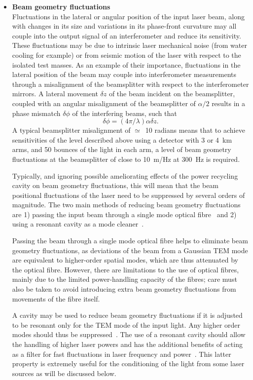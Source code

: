\documentclass{article}
\newcommand{\Hz}{Hz\super{-1/2}\xspace}
\begin{document}
\begin{itemize}
\item \textbf{Beam geometry fluctuations} \\
Fluctuations in the lateral or angular position of the input laser beam, along
with changes in its size and variations in its phase-front curvature may all
couple into the output signal of an interferometer and reduce its sensitivity.
These fluctuations may be due to intrinsic laser mechanical noise (from water
cooling for example) or from seismic motion of the laser with respect to the
isolated test masses. As an example of their importance, fluctuations in the
lateral position of the beam may couple into interferometer measurements through
a misalignment of the beamsplitter with respect to the interferometer mirrors. A
lateral movement $\delta z$ of the beam incident on the beamsplitter, coupled
with an angular misalignment of the beamsplitter of $\alpha/2$ results in a
phase mismatch $\delta \phi$ of the interfering beams, such that~\cite{Rudiger}
%
\begin{equation}
  \delta \phi = (4 \pi/\lambda) \alpha \delta z.
  \label{equation:beamgeomfluc}
\end{equation}
%
A typical beamsplitter misalignment of $\simeq$~10 radians means that to
achieve sensitivities of the level described above using a detector with 3 or
4~km arms, and 50 bounces of the light in each arm, a level of beam geometry
fluctuations at the beamsplitter of close to 10~m/\Hz at
300~Hz is required.

Typically, and ignoring possible ameliorating effects of the power recycling
cavity on beam geometry fluctuations, this will mean that the beam positional
fluctuations of the laser need to be suppressed by several orders of magnitude.
The two main methods of reducing beam geometry fluctuations are 1) passing the
input beam through a single mode optical fibre~\cite{Meersphd} and 2) using a
resonant cavity as a mode cleaner~\cite{Rudiger, Skeldon, Willke, Araya}.

Passing the beam through a single mode optical fibre helps to eliminate beam
geometry fluctuations, as deviations of the beam from a Gaussian TEM mode are
equivalent to higher-order spatial modes, which are thus attenuated by the
optical fibre.  However, there are limitations to the use of optical fibres,
mainly due to the limited power-handling capacity of the fibres; care must also
be taken to avoid introducing extra beam geometry fluctuations from movements of
the fibre itself.

A cavity may be used to reduce beam geometry fluctuations if it is adjusted to
be resonant only for the TEM mode of the input light. Any higher order modes
should thus be suppressed~\cite{Rudiger}. The use of a resonant cavity should
allow the handling of higher laser powers and has the additional benefits of
acting as a filter for fast fluctuations in laser frequency and
power~\cite{Skeldon, Willke}. This latter property is extremely useful for the
conditioning of the light from some laser sources as will be discussed below.
\end{itemize}
\end{document}
